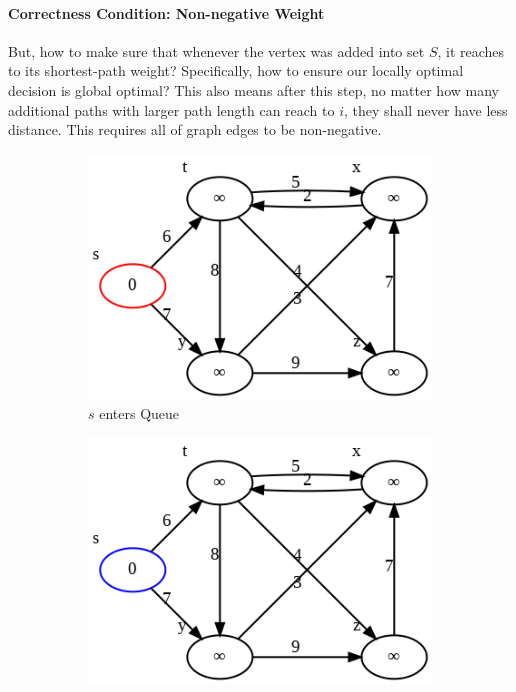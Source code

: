 \documentclass[../main.tex]{subfiles}
\begin{document}
\paragraph{Correctness Condition: Non-negative Weight}  But, how to make sure that whenever the vertex was added into set $S$, it reaches to its shortest-path weight? Specifically, how to ensure our locally optimal decision is global optimal?
This also means after this step, no matter how many additional paths with larger path length can reach to $i$, they shall never have less distance. This requires all of graph edges to be non-negative. 
\begin{figure}[!ht]
    \centering
    \begin{subfigure}{.32\textwidth}
    \includegraphics[width=0.99\columnwidth]{fig/dijkstra_0.png}
    \caption{$s$ enters Queue}
    \end{subfigure}
    \begin{subfigure}{.32\textwidth}
    \includegraphics[width=0.99\columnwidth]{fig/dijkstra_0.5.png}

\end{subfigure}
\end{figure}
\end{document}
